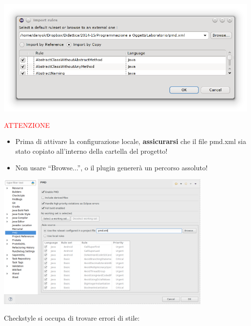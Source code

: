 \documentclass[presentation]{beamer}
\begin{document}
 {
	\centering
	\includegraphics[width=0.99\textwidth]{img/pmdimport}
}

 {
    \centering\textcolor{red}{ATTENZIONE}
    \begin{itemize}
        \item Prima di attivare la configurazione locale, \textbf{assicurarsi} 
che il file pmd.xml sia stato copiato all'interno della cartella del progetto!
        \item Non usare ``Browse...'', o il plugin genererà un percorso 
assoluto!
    \end{itemize}
	\includegraphics[width=0.8\textwidth]{img/pmdproj}
}

 {
	 {
		Checkstyle si occupa di trovare errori di stile:
	}
}
\end{document}
